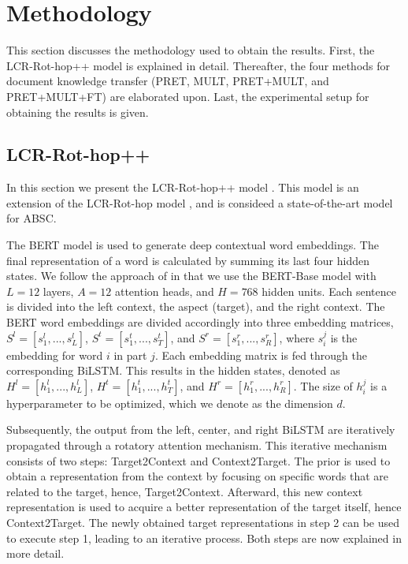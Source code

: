 \section{Methodology}
\label{sec:methodology}
This section discusses the methodology used to obtain the results. First, the LCR-Rot-hop++ model is explained in detail. Thereafter, the four methods for document knowledge transfer (PRET, MULT, PRET+MULT, and PRET+MULT+FT) are elaborated upon. Last, the experimental setup for obtaining the results is given.

\subsection{LCR-Rot-hop++}

In this section we present the LCR-Rot-hop++ model \cite{Trusca2020}. This model is an extension of the LCR-Rot-hop model \cite{Wallaart2019}, and is consideed a state-of-the-art model for ABSC.

The BERT model is used to generate deep contextual word embeddings. The final representation of a word is calculated by summing its last four hidden states. We follow the approach of \cite{Trusca2020} in that we use the BERT-Base model with $L=12$ layers, $A=12$ attention heads, and $H=768$ hidden units. Each sentence is divided into the left context, the aspect (target), and the right context. The BERT word embeddings are divided accordingly into three embedding matrices, $S^l = [s_1^l,...,s_L^l]$, $S^t = [s_1^t,...,s_T^t]$, and $S^r = [s_1^r,...,s_R^r]$, where $s_i^j$ is the embedding for word $i$ in part $j$. Each embedding matrix is fed through the corresponding BiLSTM. This results in the hidden states, denoted as $H^l = [h_1^l,...,h_L^l]$, $H^t = [h_1^t,...,h_T^t]$, and $H^r = [h_1^r,...,h_R^r]$. The size of $h_i^j$ is a hyperparameter to be optimized, which we denote as the dimension $d$. 

Subsequently, the output from the left, center, and right BiLSTM are iteratively propagated through a rotatory attention mechanism. This iterative mechanism consists of two steps: Target2Context and Context2Target. The prior is used to obtain a representation from the context by focusing on specific words that are related to the target, hence, Target2Context. Afterward, this new context representation is used to acquire a better representation of the target itself, hence Context2Target. The newly obtained target representations in step 2 can be used to execute step 1, leading to an iterative process. Both steps are now explained in more detail.

